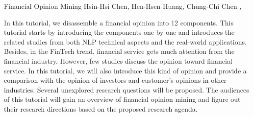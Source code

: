 \begin{tutorial}
  {Financial Opinion Mining}
  {Hsin-Hsi Chen, Hen-Hsen Huang, Chung-Chi Chen}
  {\daydateyear, \tutorialmorningtime}


In this tutorial, we disassemble a financial opinion into 12 components. This tutorial starts by introducing the components one by one and introduces the related studies from both NLP technical aspects and the real-world applications. Besides, in the FinTech trend, financial service gets much attention from the financial industry. However, few studies discuss the opinion toward financial service. In this tutorial, we will also introduce this kind of opinion and provide a comparison with the opinion of investors and customer's opinions in other industries. Several unexplored research questions will be proposed. The audiences of this tutorial will gain an overview of financial opinion mining and figure out their research directions based on the proposed research agenda.

\end{tutorial}
